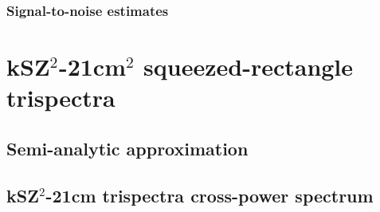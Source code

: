 \subsubsection{Signal-to-noise estimates}

\section{kSZ$^2$-21cm$^2$ squeezed-rectangle trispectra}
\label{sec:trispec}


\subsection{Semi-analytic approximation}

\subsection{kSZ$^2$-21cm trispectra cross-power spectrum}